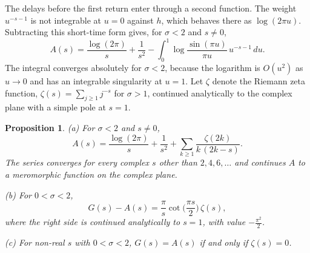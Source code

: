 \documentclass[11pt,reqno]{amsart}
\numberwithin{equation}{section}
\theoremstyle{plain}
\newtheorem{proposition}[theorem]{Proposition}
\theoremstyle{definition}
\theoremstyle{remark}
\newcounter{VCGreviewcount}
\newif\ifVCGshowreviews \VCGshowreviewstrue
\newcommand{\VCGreviewed}[1]{\stepcounter{VCGreviewcount}\ifVCGshowreviews\marginpar{\raggedright\tiny\textcolor{VCGgreen}{Reviewed by Claude\\ (review~#1)}}\fi}
\begin{document}
The delays before the first return enter through a second function. The weight $u^{-s-1}$ is not integrable at $u=0$ against $h$, which behaves there as $\log(2\pi u)$. Subtracting this short-time form gives, for $\sigma<2$ and $s\ne0$,
\begin{equation}\label{eq:A}
A(s)=\frac{\log(2\pi)}s+\frac1{s^2}-\int_0^1\log\frac{\sin(\pi u)}{\pi u}\,u^{-s-1}\,du .
\end{equation}
The integral converges absolutely for $\sigma<2$, because the logarithm is $O(u^2)$ as $u\to0$ and has an integrable singularity at $u=1$. Let $\zeta$ denote the Riemann zeta function, $\zeta(s)=\sum_{j\ge1}j^{-s}$ for $\sigma>1$, continued analytically to the complex plane with a simple pole at $s=1$.

\begin{proposition}\label{prop:A}\VCGreviewed{1}
(a) For $\sigma<2$ and $s\ne0$,
\begin{equation}\label{eq:Aseries}
A(s)=\frac{\log(2\pi)}s+\frac1{s^2}+\sum_{k\ge1}\frac{\zeta(2k)}{k\,(2k-s)} .
\end{equation}
The series converges for every complex $s$ other than $2,4,6,\dots$ and continues $A$ to a meromorphic function on the complex plane.

(b) For $0<\sigma<2$,
\begin{equation}\label{eq:GAzeta}
G(s)-A(s)=\frac\pi s\cot\Big(\frac{\pi s}2\Big)\,\zeta(s),
\end{equation}
where the right side is continued analytically to $s=1$, with value $-\frac{\pi^2}2$.

(c) For non-real $s$ with $0<\sigma<2$, $G(s)=A(s)$ if and only if $\zeta(s)=0$.
\end{proposition}
\end{document}
